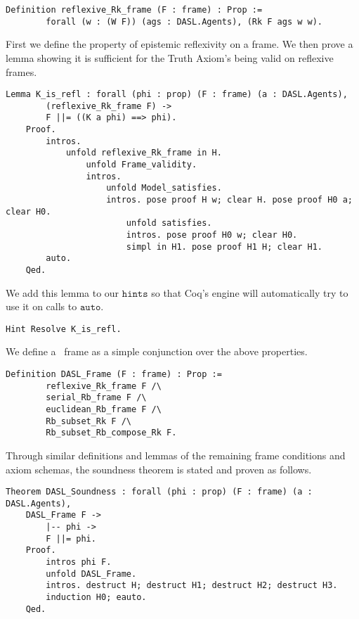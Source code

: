 \begin{tcolorbox}
	\begin{lstlisting}[language=Coq]
	Definition reflexive_Rk_frame (F : frame) : Prop := 
		forall (w : (W F)) (ags : DASL.Agents), (Rk F ags w w).
	\end{lstlisting}	
	
\end{tcolorbox}
First we define the property of epistemic reflexivity on a frame. We then prove a lemma showing it is sufficient for the Truth Axiom's being valid on reflexive frames.

\begin{tcolorbox}
	\begin{lstlisting}[language=Coq]
	Lemma K_is_refl : forall (phi : prop) (F : frame) (a : DASL.Agents),
		(reflexive_Rk_frame F) ->
		F ||= ((K a phi) ==> phi).
	Proof.
		intros.
			unfold reflexive_Rk_frame in H.
				unfold Frame_validity. 
				intros.
					unfold Model_satisfies. 
					intros. pose proof H w; clear H. pose proof H0 a; clear H0.
						unfold satisfies.
						intros. pose proof H0 w; clear H0. 
						simpl in H1. pose proof H1 H; clear H1.
		auto.
	Qed.
	\end{lstlisting}	
	
\end{tcolorbox}

We add this lemma to our $\mathtt{hints}$ so that Coq's engine will automatically try to use it on calls to $\mathtt{auto}$.

\begin{tcolorbox}
	\begin{lstlisting}[language=Coq]
Hint Resolve K_is_refl.
	\end{lstlisting}	
	
\end{tcolorbox}

We define a \DASL\ frame as a simple conjunction over the above properties.

\begin{tcolorbox}
	\begin{lstlisting}[language=Coq]
	Definition DASL_Frame (F : frame) : Prop :=
		reflexive_Rk_frame F /\
		serial_Rb_frame F /\
		euclidean_Rb_frame F /\
		Rb_subset_Rk F /\
		Rb_subset_Rb_compose_Rk F.
	\end{lstlisting}	
	
\end{tcolorbox}

Through similar definitions and lemmas of the remaining frame conditions and axiom schemas, the soundness theorem is stated and proven as follows.
\begin{tcolorbox}
	\begin{lstlisting}[language=Coq]
	Theorem DASL_Soundness : forall (phi : prop) (F : frame) (a : DASL.Agents),
	DASL_Frame F ->
		|-- phi ->
		F ||= phi.
	Proof.
		intros phi F.
		unfold DASL_Frame.
		intros. destruct H; destruct H1; destruct H2; destruct H3. 
		induction H0; eauto.  
	Qed. 
	\end{lstlisting}	
	
\end{tcolorbox}

